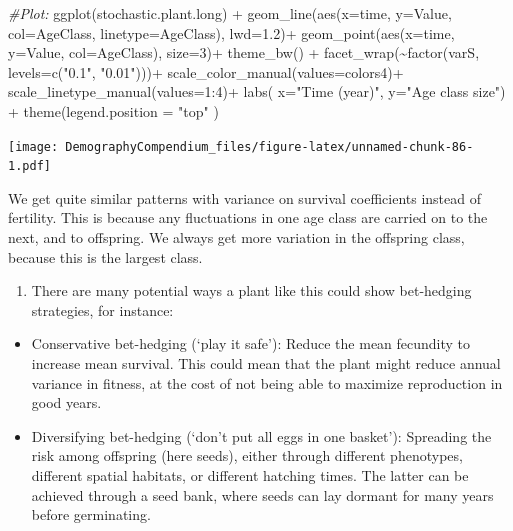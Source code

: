 \documentclass[
]{book}
\newenvironment{Shaded}{\begin{snugshade}}{\end{snugshade}}
\newcommand{\AttributeTok}[1]{\textcolor[rgb]{0.77,0.63,0.00}{#1}}
\newcommand{\CommentTok}[1]{\textcolor[rgb]{0.56,0.35,0.01}{\textit{#1}}}
\newcommand{\DecValTok}[1]{\textcolor[rgb]{0.00,0.00,0.81}{#1}}
\newcommand{\FloatTok}[1]{\textcolor[rgb]{0.00,0.00,0.81}{#1}}
\newcommand{\FunctionTok}[1]{\textcolor[rgb]{0.00,0.00,0.00}{#1}}
\newcommand{\NormalTok}[1]{#1}
\newcommand{\SpecialCharTok}[1]{\textcolor[rgb]{0.00,0.00,0.00}{#1}}
\newcommand{\StringTok}[1]{\textcolor[rgb]{0.31,0.60,0.02}{#1}}
\providecommand{\tightlist}{%
  \setlength{\itemsep}{0pt}\setlength{\parskip}{0pt}}
\begin{document}
\begin{Shaded}
\begin{Highlighting}[]
\CommentTok{\#Plot:}
\FunctionTok{ggplot}\NormalTok{(stochastic.plant.long) }\SpecialCharTok{+} 
  \FunctionTok{geom\_line}\NormalTok{(}\FunctionTok{aes}\NormalTok{(}\AttributeTok{x=}\NormalTok{time, }\AttributeTok{y=}\NormalTok{Value, }\AttributeTok{col=}\NormalTok{AgeClass, }\AttributeTok{linetype=}\NormalTok{AgeClass), }\AttributeTok{lwd=}\FloatTok{1.2}\NormalTok{)}\SpecialCharTok{+}
  \FunctionTok{geom\_point}\NormalTok{(}\FunctionTok{aes}\NormalTok{(}\AttributeTok{x=}\NormalTok{time, }\AttributeTok{y=}\NormalTok{Value, }\AttributeTok{col=}\NormalTok{AgeClass), }\AttributeTok{size=}\DecValTok{3}\NormalTok{)}\SpecialCharTok{+}
  \FunctionTok{theme\_bw}\NormalTok{() }\SpecialCharTok{+}
   \FunctionTok{facet\_wrap}\NormalTok{(}\SpecialCharTok{\textasciitilde{}}\FunctionTok{factor}\NormalTok{(varS, }\AttributeTok{levels=}\FunctionTok{c}\NormalTok{(}\StringTok{"0.1"}\NormalTok{, }\StringTok{"0.01"}\NormalTok{)))}\SpecialCharTok{+}
  \FunctionTok{scale\_color\_manual}\NormalTok{(}\AttributeTok{values=}\NormalTok{colors4)}\SpecialCharTok{+} 
  \FunctionTok{scale\_linetype\_manual}\NormalTok{(}\AttributeTok{values=}\DecValTok{1}\SpecialCharTok{:}\DecValTok{4}\NormalTok{)}\SpecialCharTok{+}  
  \FunctionTok{labs}\NormalTok{( }\AttributeTok{x=}\StringTok{"Time (year)"}\NormalTok{, }\AttributeTok{y=}\StringTok{"Age class size"}\NormalTok{)  }\SpecialCharTok{+}
   \FunctionTok{theme}\NormalTok{(}\AttributeTok{legend.position =} \StringTok{"top"}\NormalTok{ ) }
\end{Highlighting}
\end{Shaded}

\texttt{[image: DemographyCompendium\_files/figure-latex/unnamed-chunk-86-1.pdf]}

We get quite similar patterns with variance on survival coefficients instead of fertility. This is because any fluctuations in one age class are carried on to the next, and to offspring. We always get more variation in the offspring class, because this is the largest class.

\begin{enumerate}
\def\labelenumi{\arabic{enumi}.}
\setcounter{enumi}{2}
\tightlist
\item
  There are many potential ways a plant like this could show bet-hedging strategies, for instance:
\end{enumerate}

\begin{itemize}
\item
  Conservative bet-hedging (`play it safe'): Reduce the mean fecundity to increase mean survival. This could mean that the plant might reduce annual variance in fitness, at the cost of not being able to maximize reproduction in good years.
\item
  Diversifying bet-hedging (`don't put all eggs in one basket'): Spreading the risk among offspring (here seeds), either through different phenotypes, different spatial habitats, or different hatching times. The latter can be achieved through a seed bank, where seeds can lay dormant for many years before germinating.
\end{itemize}
\end{document}
